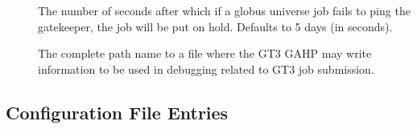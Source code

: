 \begin{description}


\item[]
\label{param:GlobusGatekeeperTimeout} The number of seconds after
which if a globus
universe job fails to ping the gatekeeper,
the job will be put on hold.
Defaults to 5 days (in seconds).

\item[]
\label{param:GT3GAHPLog} The complete path name to
a file where the GT3 GAHP may write information to be used in debugging
related to GT3 job submission.

\end{description}

\subsection{\label{sec:GridMonitor-Config-File-Entries}
Configuration File Entries}

